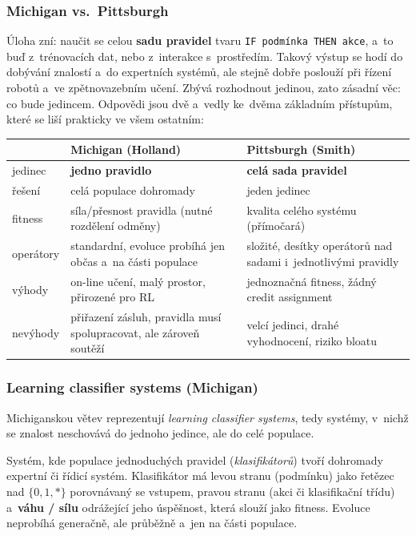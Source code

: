 \documentclass[11pt,a4paper]{article}
\theoremstyle{definition}
\begin{document}
\subsubsection{Michigan vs.\ Pittsburgh}

Úloha zní: naučit se celou \textbf{sadu pravidel} tvaru \texttt{IF podmínka THEN akce},
a~to buď z~trénovacích dat, nebo z~interakce s~prostředím. Takový výstup se hodí do dobývání
znalostí a~do expertních systémů, ale stejně dobře poslouží při řízení robotů a~ve
zpětnovazebním učení. Zbývá rozhodnout jedinou, zato zásadní věc: co bude jedincem. Odpovědi
jsou dvě a~vedly ke~dvěma základním přístupům, které se liší prakticky ve všem ostatním:

\begin{center}
\begin{tabular}{@{}p{2.8cm}p{6.2cm}p{6.2cm}@{}}
\toprule
 & \textbf{Michigan} (Holland) & \textbf{Pittsburgh} (Smith) \\
\midrule
jedinec & \textbf{jedno pravidlo} & \textbf{celá sada pravidel} \\
řešení & celá populace dohromady & jeden jedinec \\
fitness & síla/přesnost pravidla (nutné rozdělení odměny) & kvalita celého
  systému (přímočará) \\
operátory & standardní, evoluce probíhá jen občas a~na části populace &
  složité, desítky operátorů nad sadami i~jednotlivými pravidly \\
výhody & on-line učení, malý prostor, přirozené pro RL & jednoznačná fitness,
  žádný credit assignment \\
nevýhody & přiřazení zásluh, pravidla musí spolupracovat, ale zároveň soutěží &
  velcí jedinci, drahé vyhodnocení, riziko bloatu \\
\bottomrule
\end{tabular}
\end{center}

\subsubsection{Learning classifier systems (Michigan)}

Michiganskou větev reprezentují \emph{learning classifier systems}, tedy systémy, v~nichž se
znalost neschovává do jednoho jedince, ale do celé populace.

\begin{defbox}
Systém, kde populace jednoduchých pravidel (\emph{klasifikátorů}) tvoří
dohromady expertní či řídicí systém. Klasifikátor má levou stranu
(podmínku) jako řetězec nad $\{0,1,*\}$ porovnávaný se vstupem, pravou stranu
(akci či klasifikační třídu) a~\textbf{váhu / sílu} odrážející jeho úspěšnost,
která slouží jako fitness. Evoluce neprobíhá generačně, ale průběžně a~jen na
části populace.
\end{defbox}
\end{document}
